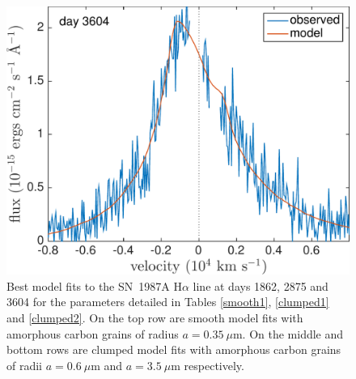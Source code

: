 \begin{figure}
\includegraphics[trim =0 0 0 -30,clip=true,scale=0.4]{chapters/chapter5/images/smooth/best_fit/d3604Ha.pdf}
\caption{Best model fits to the SN~1987A H$\alpha$ line at days 1862, 2875 and 
3604 for the parameters detailed in Tables \ref{smooth1}, \ref{clumped1} and \ref{clumped2}.  On the top row are smooth model fits with amorphous carbon grains of radius $a=0.35~\mu$m.  On the middle and bottom rows are clumped model fits with amorphous carbon grains of radii $a=0.6~\mu$m and $a=3.5~\mu$m respectively.}
\label{}
\end{figure}

